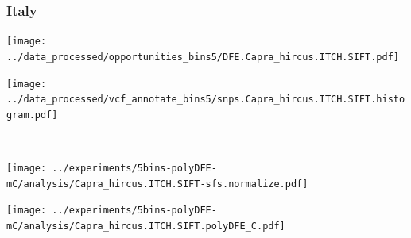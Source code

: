 \subsubsection{Italy}

\begin{minipage}{0.49\linewidth}
    \texttt{[image: ../data\_processed/opportunities\_bins5/DFE.Capra\_hircus.ITCH.SIFT.pdf]}
\end{minipage}
\begin{minipage}{0.49\linewidth}
    \texttt{[image: ../data\_processed/vcf\_annotate\_bins5/snps.Capra\_hircus.ITCH.SIFT.histogram.pdf]}
\end{minipage}
\\
\begin{minipage}{0.49\linewidth}
    \texttt{[image: ../experiments/5bins-polyDFE-mC/analysis/Capra\_hircus.ITCH.SIFT-sfs.normalize.pdf]}
\end{minipage}
\begin{minipage}{0.4\linewidth}
    \texttt{[image: ../experiments/5bins-polyDFE-mC/analysis/Capra\_hircus.ITCH.SIFT.polyDFE\_C.pdf]}
\end{minipage}
